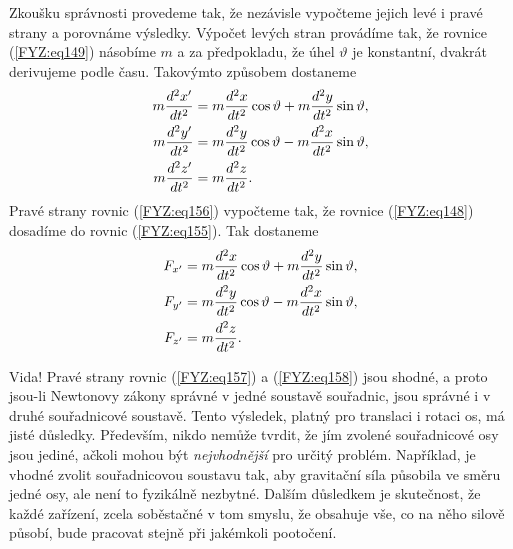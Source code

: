 {    Zkoušku správnosti provedeme tak, že nezávisle vypočteme jejich levé i pravé strany a porovnáme 
    výsledky. Výpočet levých stran provádíme tak, že rovnice (\ref{FYZ:eq149}) násobíme \(m\) a za 
    předpokladu, že úhel \(\vartheta\) je konstantní, dvakrát derivujeme podle času. Takovýmto 
    způsobem dostaneme
    \begin{subequations}
      \label{FYZ:eq157}
      \begin{align}
        m\frac{d^2 x'}{d t^2} &= 
          m\frac{d^2 x}{d t^2}\cos\vartheta + m\frac{d^2 y}{d t^2}\sin\vartheta, \label{FYZ:eq157a}\\
        m\frac{d^2 y'}{d t^2} &= 
          m\frac{d^2 y}{d t^2}\cos\vartheta - m\frac{d^2 x}{d t^2}\sin\vartheta, \label{FYZ:eq157b}\\
        m\frac{d^2 z'}{d t^2} &= 
          m\frac{d^2 z}{d t^2}.                                          \label{FYZ:eq157c}
      \end{align}
    \end{subequations}
    Pravé strany rovnic (\ref{FYZ:eq156}) vypočteme tak, že rovnice (\ref{FYZ:eq148}) dosadíme do 
    rovnic (\ref{FYZ:eq155}). Tak dostaneme
    \begin{subequations}
      \label{FYZ:eq158}
      \begin{align}
        F_{x'} &= m\frac{d^2 x}{d t^2}\cos\vartheta + m\frac{d^2 y}{d t^2}\sin\vartheta, \label{FYZ:eq158a}\\
        F_{y'} &= m\frac{d^2 y}{d t^2}\cos\vartheta - m\frac{d^2 x}{d t^2}\sin\vartheta, \label{FYZ:eq158b}\\
        F_{z'} &= m\frac{d^2 z}{d t^2}.                                          \label{FYZ:eq158c}
      \end{align}
    \end{subequations}
    
    Vida! Pravé strany rovnic (\ref{FYZ:eq157}) a (\ref{FYZ:eq158}) jsou shodné, a proto jsou-li 
    Newtonovy zákony správné v jedné soustavě souřadnic, jsou správné i v druhé souřadnicové 
    soustavě. Tento výsledek, platný pro translaci i rotaci os, má jisté důsledky. Především, nikdo 
    nemůže tvrdit, že jím zvolené souřadnicové osy jsou jediné, ačkoli mohou být 
    \emph{nejvhodnější} pro určitý problém. Například, je vhodné zvolit souřadnicovou soustavu tak, 
    aby gravitační síla působila ve směru jedné osy, ale není to fyzikálně nezbytné. Dalším 
    důsledkem je skutečnost, že každé zařízení, zcela soběstačné v tom smyslu, že obsahuje vše, co 
    na něho silově působí, bude pracovat stejně při jakémkoli pootočení.
    
}
